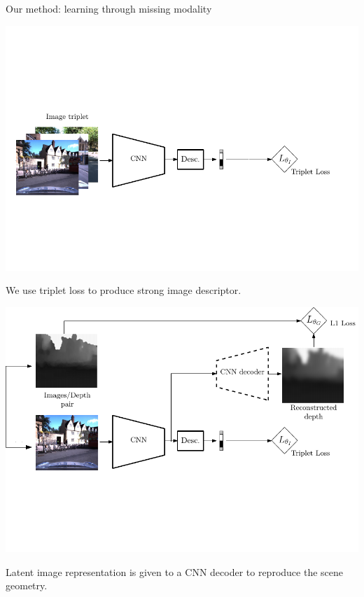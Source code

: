 \begin{frame}{Our method: learning through missing modality}	
	\only<1>
	{
	\begin{minipage}{0.6\linewidth}
		\centering
		\includegraphics[width=\linewidth]{vect/method/fig3/1d}	
	\end{minipage}\hfill
	\begin{minipage}{0.3\linewidth}
		\raggedright
		We use triplet loss to produce strong image descriptor.
	\end{minipage}		
	}
	{
	\begin{minipage}{0.6\linewidth}
		\centering
		\includegraphics[width=\linewidth]{vect/method/fig3/2d}	
	\end{minipage}\hfill
	\begin{minipage}{0.3\linewidth}
		\raggedright
		Latent image representation is given to a CNN decoder to reproduce the scene geometry.\\
		\vspace{0.5cm}
		

\end{minipage}}
\end{frame}
